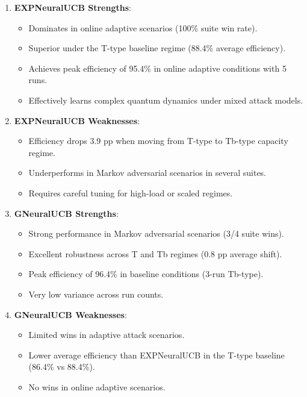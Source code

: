 \documentclass[11pt,a4paper]{article}
\begin{document}
\begin{enumerate}
\item \textbf{EXPNeuralUCB Strengths}:
    \begin{itemize}
    \item Dominates in online adaptive scenarios (100\% suite win rate).
    \item Superior under the T-type baseline regime (88.4\% average efficiency).
    \item Achieves peak efficiency of 95.4\% in online adaptive conditions with 5 runs.
    \item Effectively learns complex quantum dynamics under mixed attack models.
    \end{itemize}

\item \textbf{EXPNeuralUCB Weaknesses}:
    \begin{itemize}
    \item Efficiency drops 3.9 pp when moving from T-type to Tb-type capacity regime.
    \item Underperforms in Markov adversarial scenarios in several suites.
    \item Requires careful tuning for high-load or scaled regimes.
    \end{itemize}

\item \textbf{GNeuralUCB Strengths}:
    \begin{itemize}
    \item Strong performance in Markov adversarial scenarios (3/4 suite wins).
    \item Excellent robustness across T and Tb regimes (0.8 pp average shift).
    \item Peak efficiency of 96.4\% in baseline conditions (3-run Tb-type).
    \item Very low variance across run counts.
    \end{itemize}

\item \textbf{GNeuralUCB Weaknesses}:
    \begin{itemize}
    \item Limited wins in adaptive attack scenarios.
    \item Lower average efficiency than EXPNeuralUCB in the T-type baseline (86.4\% vs 88.4\%).
    \item No wins in online adaptive scenarios.
    \end{itemize}
\end{enumerate}
\end{document}
